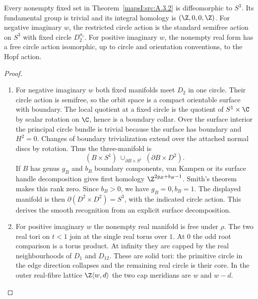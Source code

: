 \begin{theorem}\hypertarget{tag-02PG}{}\label{mapsI:src:A.3.3}

Every nonempty fixed set in Theorem~\ref{mapsI:src:A.3.2} is diffeomorphic to $S^3$.
Its fundamental group is trivial and its integral homology is
$(\Z,0,0,\Z)$. For negative imaginary $w$, the restricted circle action
is the standard semifree action on $S^3$ with fixed circle
$D_2^{\sigma_c}$. For positive imaginary $w$, the nonempty real form
has a free circle action isomorphic, up to circle and orientation
conventions, to the Hopf action.
\end{theorem}



\begin{proof}
\begin{enumerate}[label=\arabic*.,leftmargin=*]
\item For negative imaginary $w$ both fixed manifolds meet $D_2$ in one circle.
Their circle action is semifree, so the orbit space is a compact
orientable surface with boundary. The local quotient at a fixed circle
is the quotient of $S^1\times\C$ by scalar rotation on $\C$, hence is
a boundary collar. Over the surface interior the principal circle bundle
is trivial because the surface has boundary and $H^2=0$. Changes of
boundary trivialization extend over the attached normal discs by
rotation. Thus the three-manifold is
\[
 (B\times S^1)\ \cup_{\partial B\times S^1}\ (\partial B\times D^2).
\]
If $B$ has genus $g_B$ and $b_B$ boundary components, van Kampen or its
surface handle decomposition gives first homology
$\Z^{2g_B+b_B-1}$. Smith's theorem makes this rank zero. Since $b_B>0$,
we have $g_B=0,b_B=1$. The displayed manifold is then
$\partial(D^2\times D^2)=S^3$, with the indicated circle action. This
derives the smooth recognition from an explicit surface decomposition.

\item For positive imaginary $w$ the nonempty real manifold is free under
$\rho$. The two real tori on $t<1$ join at the single real torus over
$1$. At $0$ the odd root comparison is a torus product. At infinity
they are capped by the real neighbourhoods of $D_1$ and $D_{12}$.
These are solid tori: the primitive circle in the edge direction
collapses and the remaining real circle is their core. In the outer
real-fibre lattice $\Z\langle w,d\rangle$ the two cap meridians are
$w$ and $w-d$.


\end{enumerate}
\end{proof}
